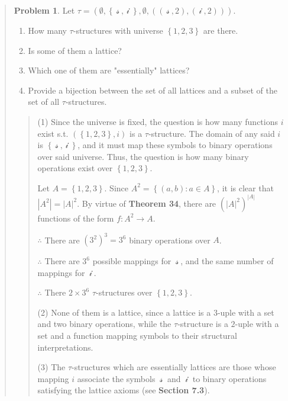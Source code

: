 \documentclass[a4paper, 12pt]{article}
\theoremstyle{definition}
\newtheorem{problem}{Problem}
\theoremstyle{definition}
\theoremstyle{definition}
\begin{document}
\begin{quote}
\begin{quote}
\end{quote}
\normalsize


\begin{problem}
    Let $\tau = \left( \emptyset, \left\{ ~\mathcal{s}~, ~\mathcal{i}~ \right\}, \emptyset, \left( (~\mathcal{s}~, 2), (~\mathcal{i}~, 2) \right)   \right) $. 

    \begin{enumerate}
        \item How many $\tau$-structures with universe $\left\{ 1, 2, 3 \right\} $ are there.
        \item Is some of them a lattice?
        \item Which one of them are "essentially" lattices?
        \item Provide a bijection between the set of all lattices and a subset 
            of the set of all $\tau$-structures.
    \end{enumerate}
\end{problem}

\small
\begin{quote}


(1) Since the universe is fixed, the question is how many functions $i$ exist
s.t. $(\left\{ 1, 2, 3 \right\}, i)$ is a $\tau$-structure. The domain of any
said $i$ is $\left\{ ~\mathcal{s}~, ~\mathcal{i}~ \right\} $, and it must map
these symbols to binary operations over said universe. Thus, the question is 
how many binary operations exist over $\left\{ 1, 2, 3 \right\} $.

Let $A = \left\{ 1, 2, 3 \right\} $. Since $A^2 = \left\{ (a, b) : a \in A \right\} $,
it is clear that $|A^2| = |A|^2$. By virtue of \textbf{Theorem 34}, there are
$(|A|^2)^{|A|}$ functions of the form $f : A^2 \to A$. 

$\therefore $ There are $(3^2)^{3} = 3^{6}$ binary operations over $A$.

$\therefore $ There are $3^6$ possible mappings for $~\mathcal{s}~$, and the same number of mappings for $~\mathcal{i}~$. 

$\therefore $ There $2 \times 3^6$ $\tau$-structures over $\left\{ 1, 2, 3 \right\} $.

(2) None of them is a lattice, since a lattice is a $3$-uple with a set and two
binary operations, while the $\tau$-structure is a $2$-uple with a set and a
function mapping symbols to their structural interpretations.

(3) The $\tau$-structures which are essentially lattices are those whose
mapping $i$ associate the symbols $~\mathcal{s}~$ and $~\mathcal{i}~$ to binary
operations satisfying the lattice axioms (see \textbf{Section 7.3}).


\end{quote}
\end{quote}
\end{document}
